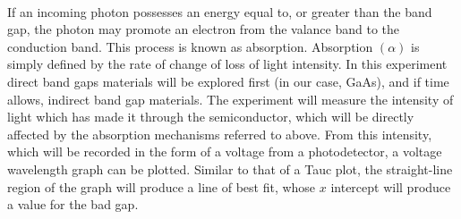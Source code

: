 \documentclass{article}
\begin{document}
\

 If an incoming photon possesses an energy equal to, or greater than the band gap, the photon may promote an electron from the valance band to the conduction band. This process is known as absorption. Absorption $(\alpha)$ is simply defined by the rate of change of loss of light intensity. In this experiment direct band gaps materials will be explored first (in our case, GaAs), and if time allows, indirect band gap materials. The experiment will measure the intensity of light which has made it through the semiconductor, which will be directly affected by the absorption mechanisms referred to above. From this intensity, which will be recorded in the form of a voltage from a photodetector, a voltage wavelength graph can be plotted. Similar to that of a Tauc plot, the straight-line region of the graph will produce a line of best fit, whose $x$ intercept will produce a value for the bad gap. 
\end{document}
